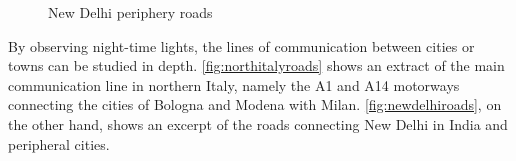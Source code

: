 \begin{figure}
    \centering
    \qquad
    \caption{New Delhi periphery roads}%
    \label{fig:newdelhiroads}
\end{figure}
By observing night-time lights, the lines of communication between cities or towns can be studied in depth. \autoref{fig:northitalyroads} shows an extract of the main communication line in northern Italy, namely the A1 and A14 motorways connecting the cities of Bologna and Modena with Milan. \autoref{fig:newdelhiroads}, on the other hand, shows an excerpt of the roads connecting New Delhi in India and peripheral cities.

